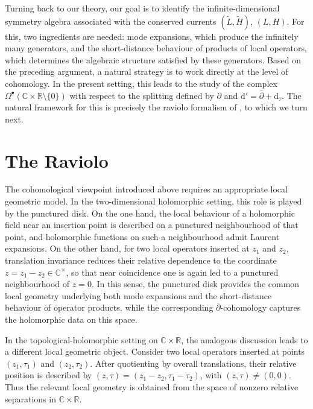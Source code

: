 \documentclass[11pt]{amsart}
\newcommand{\R}{{\mathbb R}}
\numberwithin{equation}{section}
\numberwithin{figure}{section}
\numberwithin{table}{section}
\renewcommand{\d}{\mathrm{d}}
\theoremstyle{thm}
\numberwithin{equation}{subsection}
\theoremstyle{definition}
\theoremstyle{rem}
\begin{document}
Turning back to our theory, our goal is to identify the infinite-dimensional symmetry algebra associated with the conserved currents 
$(\tilde L,\tilde H)$, $(L,H)$. For this, two ingredients are needed: mode expansions, which produce the infinitely many generators, and the short-distance behaviour of products of local operators, which determines the algebraic structure satisfied by these generators. Based on the preceding argument, a natural strategy is to work directly at the level of cohomology. In the present setting, this leads to the study of the complex \(\Omega^\bullet(\mathbb C\times\R\setminus\{0\})\) with respect to the splitting defined by \(\partial\) and \(\d'=\bar\partial+\d_\tau\). The natural framework for this is precisely the raviolo formalism of \cite{Garner:2023zqn}, to which we turn next. 



\section{The Raviolo}\label{raviolo}


The cohomological viewpoint introduced above requires an appropriate local geometric model. In the two-dimensional holomorphic setting, this role is played by the punctured disk. On the one hand, the local behaviour of a holomorphic field near an insertion point is described on a punctured neighbourhood of that point, and holomorphic functions on such a neighbourhood admit Laurent expansions. On the other hand, for two local operators inserted at \(z_1\) and \(z_2\), translation invariance reduces their relative dependence to the coordinate \(z=z_1-z_2\in\mathbb C^\times\), so that near coincidence one is again led to a punctured neighbourhood of \(z=0\). In this sense, the punctured disk provides the common local geometry underlying both mode expansions and the short-distance behaviour of operator products, while the corresponding \(\bar\partial\)-cohomology captures the holomorphic data on this space.


In the topological-holomorphic setting on \(\mathbb C\times \mathbb R\), the analogous discussion leads to a different local geometric object. Consider two local operators inserted at points \((z_1,\tau_1)\) and \((z_2,\tau_2)\). After quotienting by overall translations, their relative position is described by $(z,\tau)=(z_1-z_2,\tau_1-\tau_2)$, with \((z,\tau)\neq(0,0)\). Thus the relevant local geometry is obtained from the space of nonzero relative separations in \(\mathbb C\times\mathbb R\). 
\end{document}
